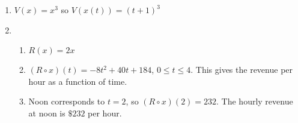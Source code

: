 \begin{enumerate}
\setcounter{enumi}{\value{HW}}

\item $V(x) = x^{3}$ so $V(x(t)) = (t + 1)^{3}$

\item  \begin{enumerate}

\item  $R(x) = 2x$

\item  $\left(R \circ x \right)(t) =  -8t^2+40t+184$, $0 \leq t \leq 4$.  This gives the revenue per hour as a function of time.

\item  Noon corresponds to $t=2$, so $\left(R \circ x \right)(2) = 232$.  The hourly revenue at noon is $\$232$ per hour. 

\end{enumerate}

\end{enumerate}
